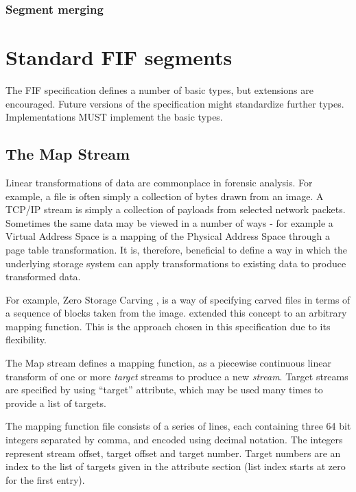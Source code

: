 \documentclass[10pt, conference]{IEEEtran}
\begin{document}
\subsubsection{Segment merging}




\section{Standard FIF segments}
The FIF specification defines a number of basic types, but extensions
are encouraged. Future versions of the specification might standardize
further types. Implementations MUST implement the basic types.

\subsection{The Map Stream}
\label{map_stream}
Linear transformations of data are commonplace in forensic
analysis. For example, a file is often simply a collection of bytes
drawn from an image. A TCP/IP stream is simply a collection of
payloads from selected network packets. Sometimes the same data may be
viewed in a number of ways - for example a Virtual Address Space is a
mapping of the Physical Address Space through a page table
transformation. It is, therefore, beneficial to define a way in which
the underlying storage system can apply transformations to existing
data to produce transformed data.

For example, Zero Storage Carving \cite{Meijer2006}, is a way of
specifying carved files in terms of a sequence of blocks taken from
the image. \cite{Cohen2007} extended this concept to an arbitrary
mapping function. This is the approach chosen in this specification
due to its flexibility. 

The Map stream defines a mapping function, as a piecewise continuous
linear transform of one or more {\em target} streams to produce a new
{\em stream}. Target streams are specified by using ``target''
attribute, which may be used many times to provide a list of targets.

The mapping function file consists of a series of lines, each
containing three 64 bit integers separated by comma, and encoded using
decimal notation. The integers represent stream offset, target offset
and target number. Target numbers are an index to the list of targets
given in the attribute section (list index starts at zero for the
first entry).
\end{document}
